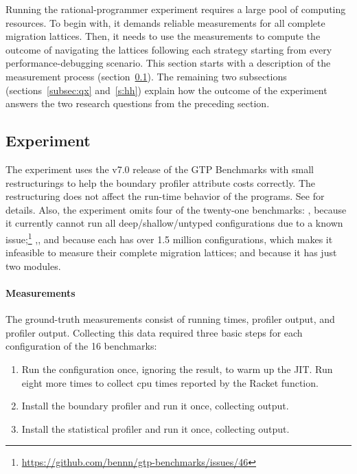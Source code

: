 \newcommand{\numgtp}{16}
\newcommand{\boundaryMB}{536} %
\newcommand{\statisticalMB}{4645} %
\newcommand{\runtimeMB}{44}

Running the rational-programmer experiment requires a large pool of
computing resources.  To begin with, it demands reliable measurements for
all complete migration lattices. Then, it needs to use the measurements to
compute the outcome of navigating the
lattices following each strategy starting from every performance-debugging
scenario. This section starts with a description of the measurement
process (section~\ref{subsec:experiment}). The remaining two subsections
(sections~\ref{subsec:qx} and~\ref{s:hh}) explain how the outcome of the
experiment answers the two research questions from the preceding
section.

\subsection{Experiment} \label{subsec:experiment} \label{sec:data}

The experiment uses the v7.0 release of the GTP Benchmarks
with small restructurings to help the boundary profiler attribute costs
correctly.
The restructuring does not affect the run-time behavior of the programs.
See 
for details.
Also, the experiment omits four of the twenty-one benchmarks:
, because it currently cannot run all deep/shallow/untyped
configurations due to a known issue;\footnote{
\url{https://github.com/bennn/gtp-benchmarks/issues/46}}
,, and  because each has over 1.5
million configurations, which makes it infeasible to measure their complete
migration lattices; and  because it has just two modules.

\paragraph{Measurements} 

The ground-truth measurements consist of running times, \boundary{} profiler output,
and \statistical{} profiler output.  Collecting this data required three basic steps
for each configuration of the \numgtp{} benchmarks:
\begin{enumerate}

\item Run the configuration once, ignoring the result, to warm up the JIT.  Run
  eight more times to collect {cpu time}s reported by the Racket  function.

\item Install the boundary profiler and run it once, collecting output.

\item Install the statistical profiler and run it once, collecting output.

\end{enumerate}

